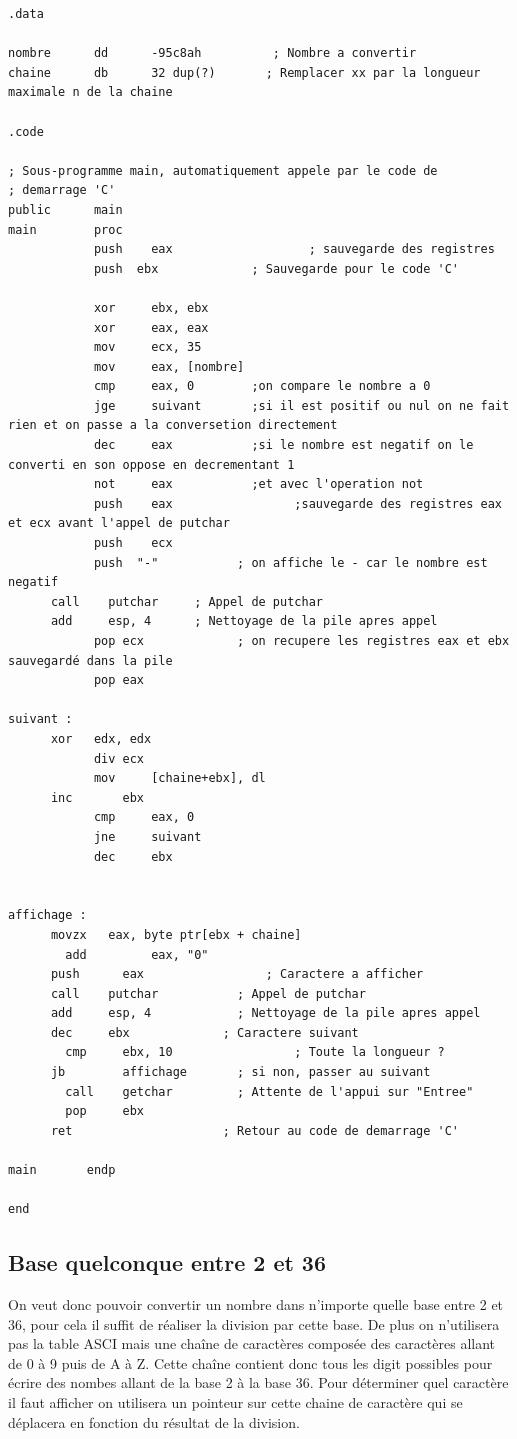 \documentclass[11pt]{report}
\begin{document}
\begin{lstlisting}
.data

nombre      dd      -95c8ah          ; Nombre a convertir
chaine      db      32 dup(?)       ; Remplacer xx par la longueur maximale n de la chaine

.code

; Sous-programme main, automatiquement appele par le code de
; demarrage 'C'
public      main
main        proc
			push 	eax				      ; sauvegarde des registres
			push  ebx             ; Sauvegarde pour le code 'C'

			xor		ebx, ebx
			xor		eax, eax
			mov		ecx, 35
			mov		eax, [nombre]
			cmp 	eax, 0        ;on compare le nombre a 0
			jge 	suivant       ;si il est positif ou nul on ne fait rien et on passe a la conversetion directement
			dec 	eax           ;si le nombre est negatif on le converti en son oppose en decrementant 1
			not 	eax           ;et avec l'operation not
			push 	eax				    ;sauvegarde des registres eax et ecx avant l'appel de putchar
			push	ecx
			push  "-"           ; on affiche le - car le nombre est negatif
      call    putchar     ; Appel de putchar
      add     esp, 4      ; Nettoyage de la pile apres appel
			pop ecx             ; on recupere les registres eax et ebx sauvegardé dans la pile
			pop eax

suivant :
      xor 	edx, edx
			div	ecx
			mov		[chaine+ebx], dl
      inc		ebx
			cmp		eax, 0
			jne		suivant
			dec		ebx


affichage : 
      movzx   eax, byte ptr[ebx + chaine]
	    add			eax, "0"
      push   	eax         		; Caractere a afficher
      call    putchar     		; Appel de putchar
      add     esp, 4      		; Nettoyage de la pile apres appel
  	  dec     ebx             ; Caractere suivant
	    cmp     ebx, 10 				; Toute la longueur ?
      jb     	affichage       ; si non, passer au suivant
	    call    getchar         ; Attente de l'appui sur "Entree"
	    pop     ebx
      ret                     ; Retour au code de demarrage 'C'

main       endp

end
\end{lstlisting}
\subsection{Base quelconque entre 2 et 36}


On veut donc pouvoir convertir un nombre dans n'importe quelle base entre 2 et 36,
pour cela il suffit de réaliser la division par cette base.
De plus on n'utilisera pas la table ASCI mais une chaîne de caractères composée des caractères allant de 0 à 9 puis de A à Z.
Cette chaîne contient donc tous les digit possibles pour écrire des nombes allant de la base 2 à la base 36.
Pour déterminer quel caractère il faut afficher on utilisera un pointeur
sur cette chaine de caractère qui se déplacera en fonction du résultat de la division.
\end{document}
